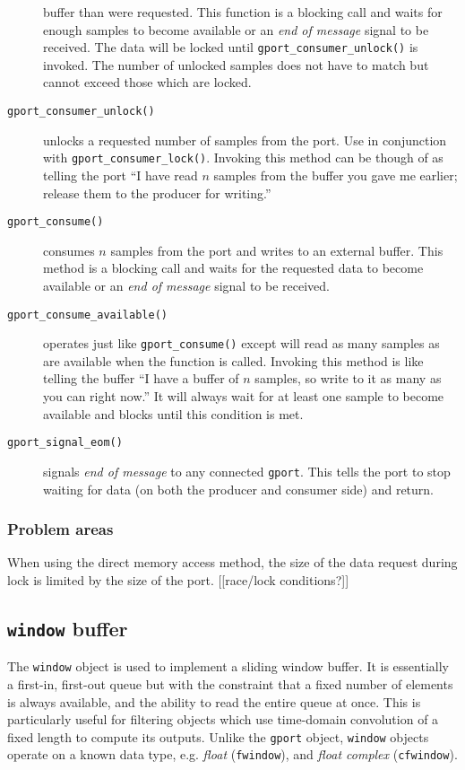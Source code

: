 \begin{description}
    buffer than were requested.
    This function is a blocking call and waits for enough samples to become
    available or an {\it end of message} signal to be received.
    The data will be locked until {\tt gport\_consumer\_unlock()} is invoked.
    The number of unlocked samples does not have to match but cannot exceed
    those which are locked.
\item[{\tt gport\_consumer\_unlock()}]
    unlocks a requested number of samples from the port.
    Use in conjunction with {\tt gport\_consumer\_lock()}.
    Invoking this method can be though of as telling the port ``I have read
    $n$ samples from the buffer you gave me earlier; release them to the
    producer for writing.''
\item[{\tt gport\_consume()}]
    consumes $n$ samples from the port and writes to an external buffer.
    This method is a blocking call and waits for the requested data to become
    available or an {\it end of message} signal to be received.
\item[{\tt gport\_consume\_available()}]
    operates just like {\tt gport\_consume()} except will read as many samples
    as are available when the function is called.
    Invoking this method is like telling the buffer ``I have a buffer of $n$
    samples, so write to it as many as you can right now.''
    It will always wait for at least one sample to become available and blocks
    until this condition is met.
\item[{\tt gport\_signal\_eom()}]
    signals {\it end of message} to any connected {\tt gport}.
    This tells the port to stop waiting for data (on both the producer and
    consumer side) and return.
\end{description}


\subsubsection{Problem areas}
When using the direct memory access method, the size of the data request
during lock is limited by the size of the port.
[[race/lock conditions?]]

\subsection{{\tt window} buffer}
\label{module:buffer:window}
The {\tt window} object is used to implement a sliding window buffer.
It is essentially a first-in, first-out queue but with the constraint that a
fixed number of elements is always available, and the ability to read the
entire queue at once.
This is particularly useful for filtering objects which use time-domain
convolution of a fixed length to compute its outputs.
Unlike the {\tt gport} object, {\tt window} objects operate on a known data
type, e.g.
{\it float} ({\tt fwindow}), and
{\it float complex} ({\tt cfwindow}).

